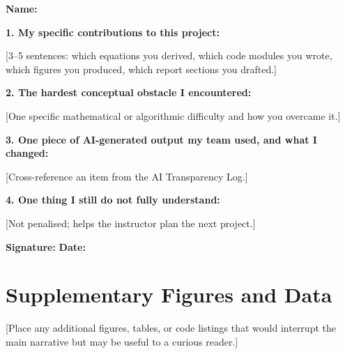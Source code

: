 \documentclass[11pt,a4paper]{article}
\theoremstyle{definition}
\theoremstyle{remark}
\begin{document}
\begin{formbox}
\textbf{Name:} \underline{\hspace{5cm}}

\vspace{0.5em}
\textbf{1. My specific contributions to this project:}

[3--5 sentences: which equations you derived, which code modules you wrote,
which figures you produced, which report sections you drafted.]

\vspace{0.5em}
\textbf{2. The hardest conceptual obstacle I encountered:}

[One specific mathematical or algorithmic difficulty and how you overcame it.]

\vspace{0.5em}
\textbf{3. One piece of AI-generated output my team used, and what I changed:}

[Cross-reference an item from the AI Transparency Log.]

\vspace{0.5em}
\textbf{4. One thing I still do not fully understand:}

[Not penalised; helps the instructor plan the next project.]

\vspace{0.5em}
\textbf{Signature:} \underline{\hspace{4cm}} \quad \textbf{Date:} \underline{\hspace{2cm}}
\end{formbox}

\section{Supplementary Figures and Data}

[Place any additional figures, tables, or code listings that would interrupt the
main narrative but may be useful to a curious reader.]
\end{document}

